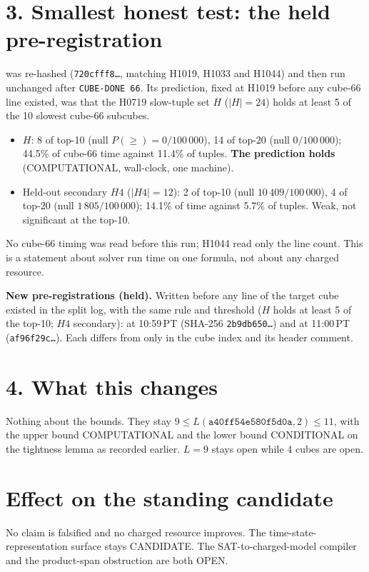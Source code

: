 \documentclass[11pt]{article}
\begin{document}
\section*{3. Smallest honest test: the held pre-registration}
 was re-hashed (\texttt{720cfff8\ldots}, matching H1019, H1033 and H1044) and then run unchanged after \texttt{CUBE-DONE 66}. Its prediction, fixed at H1019 before any cube-66 line existed, was that the H0719 slow-tuple set $H$ ($|H|=24$) holds at least 5 of the 10 slowest cube-66 subcubes.
\begin{itemize}
\item $H$: 8 of top-10 (null $P(\ge)=0/100\,000$), 14 of top-20 (null $0/100\,000$); 44.5\% of cube-66 time against 11.4\% of tuples. \textbf{The prediction holds} (COMPUTATIONAL, wall-clock, one machine).
\item Held-out secondary $H4$ ($|H4|=12$): 2 of top-10 (null $10\,409/100\,000$), 4 of top-20 (null $1\,805/100\,000$); 14.1\% of time against 5.7\% of tuples. Weak, not significant at the top-10.
\end{itemize}
No cube-66 timing was read before this run; H1044 read only the line count. This is a statement about solver run time on one formula, not about any charged resource.

\textbf{New pre-registrations (held).} Written before any line of the target cube existed in the split log, with the same rule and threshold ($H$ holds at least 5 of the top-10; $H4$ secondary):  at 10:59\,PT (SHA-256 \texttt{2b9db650\ldots}) and  at 11:00\,PT (\texttt{af96f29c\ldots}). Each differs from  only in the cube index and its header comment.

\section*{4. What this changes}
Nothing about the bounds. They stay $9\le L(\texttt{a40ff54e580f5d0a},2)\le 11$, with the upper bound COMPUTATIONAL and the lower bound CONDITIONAL on the tightness lemma as recorded earlier. $L=9$ stays open while 4 cubes are open.

\section*{Effect on the standing candidate}
No claim is falsified and no charged resource improves. The time-state-representation surface stays CANDIDATE. The SAT-to-charged-model compiler and the product-span obstruction are both OPEN.
\end{document}

